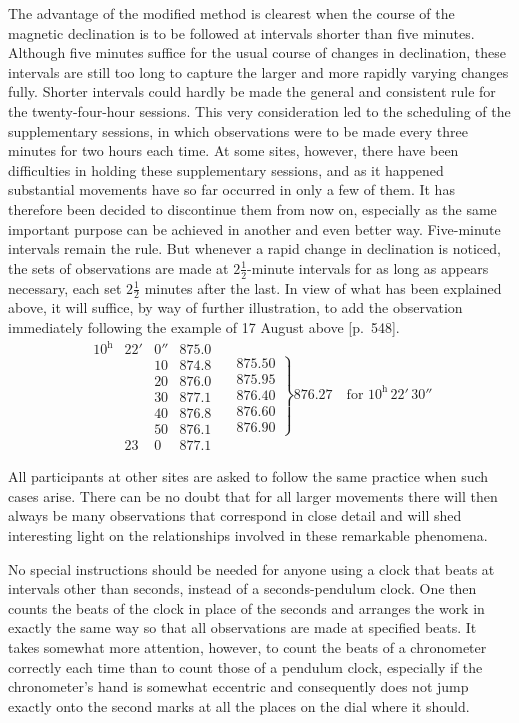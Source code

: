 The advantage of the modified method is clearest when the course of the magnetic declination is to be followed at intervals shorter than five minutes. Although five minutes suffice for the usual course of changes in declination, these intervals are still too long to capture the larger and more rapidly varying changes fully. Shorter intervals could hardly be made the general and consistent rule for the twenty-four-hour sessions. This very consideration led to the scheduling of the supplementary sessions, in which observations were to be made every three minutes for two hours each time. At some sites, however, there have been difficulties in holding these supplementary sessions, and as it happened substantial movements have so far occurred in only a few of them. It has therefore been decided to discontinue them from now on, especially as the same important purpose can be achieved in another and even better way. Five-minute intervals remain the rule. But whenever a rapid change in declination is noticed, the sets of observations are made at $2\frac12$-minute intervals for as long as appears necessary, each set $2\frac12$ minutes after the last. In view of what has been explained above, it will suffice, by way of further illustration, to add the observation immediately following the example of 17 August above [p.~548].
\[
\begin{array}{rrr|r|}
10^{\mathrm h}&22'&0''&875.0\\
&&10&874.8\\
&&20&876.0\\
&&30&877.1\\
&&40&876.8\\
&&50&876.1\\
&23&0&877.1
\end{array}\quad
\left.\begin{array}{r}875.50\\875.95\\876.40\\876.60\\876.90\end{array}\right\}876.27\quad\text{for }10^{\mathrm h}\,22'\,30''
\]

All participants at other sites are asked to follow the same practice when such cases arise. There can be no doubt that for all larger movements there will then always be many observations that correspond in close detail and will shed interesting light on the relationships involved in these remarkable phenomena.

No special instructions should be needed for anyone using a clock that beats at intervals other than seconds, instead of a seconds-pendulum clock. One then counts the beats of the clock in place of the seconds and arranges the work in exactly the same way so that all observations are made at specified beats. It takes somewhat more attention, however, to count the beats of a chronometer correctly each time than to count those of a pendulum clock, especially if the chronometer’s hand is somewhat eccentric and consequently does not jump exactly onto the second marks at all the places on the dial where it should.


